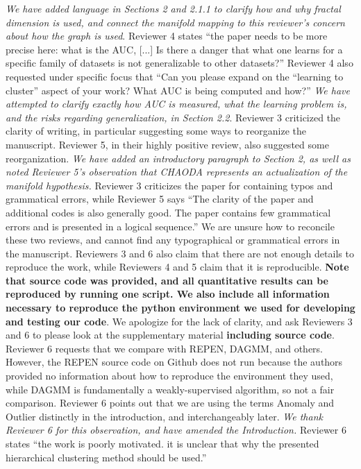 \documentclass{article}
\begin{document}
\emph{We have added language in Sections 2 and 2.1.1 to clarify how and why fractal dimension is used, and connect the manifold mapping to this reviewer's concern about how the graph is used}.
Reviewer 4 states ``the paper needs to be more precise here: what is the AUC, [...] Is there a danger that what one learns for a specific family of datasets is not generalizable to other datasets?''
Reviewer 4 also requested under specific focus that ``Can you please expand on the ``learning to cluster'' aspect of your work? What AUC is being computed and how?''
\emph{We have attempted to clarify exactly how AUC is measured, what the learning problem is, and the risks regarding generalization, in Section 2.2}.
Reviewer 3 criticized the clarity of writing, in particular suggesting some ways to reorganize the manuscript.
Reviewer 5, in their highly positive review, also suggested some reorganization.
\emph{We have added an introductory paragraph to Section 2, as well as noted Reviewer 5's observation that CHAODA represents an actualization of the manifold hypothesis.}
Reviewer 3 criticizes the paper for containing typos and grammatical errors, while Reviewer 5 says ``The clarity of the paper and additional codes is also generally good. The paper contains few grammatical errors and is presented in a logical sequence.''
We are unsure how to reconcile these two reviews, and cannot find any typographical or grammatical errors in the manuscript.
Reviewers 3 and 6 also claim that there are not enough details to reproduce the work, while Reviewers 4 and 5 claim that it is reproducible.
\textbf{Note that source code was provided, and all quantitative results can be reproduced by running one script.
We also include all information necessary to reproduce the python environment we used for developing and testing our code}.
We apologize for the lack of clarity, and ask Reviewers 3 and 6 to please look at the supplementary material \textbf{including source code}.
Reviewer 6 requests that we compare with REPEN, DAGMM, and others.
However, the REPEN source code on Github does not run because the authors provided no information about how to reproduce the environment they used, while DAGMM is fundamentally a weakly-supervised algorithm, so not a fair comparison.
Reviewer 6 points out that we are using the terms Anomaly and Outlier distinctly in the introduction, and interchangeably later.
\emph{We thank Reviewer 6 for this observation, and have amended the Introduction.}
Reviewer 6 states ``the work is poorly motivated. it is unclear that why the presented hierarchical clustering method should be used.''
\end{document}
